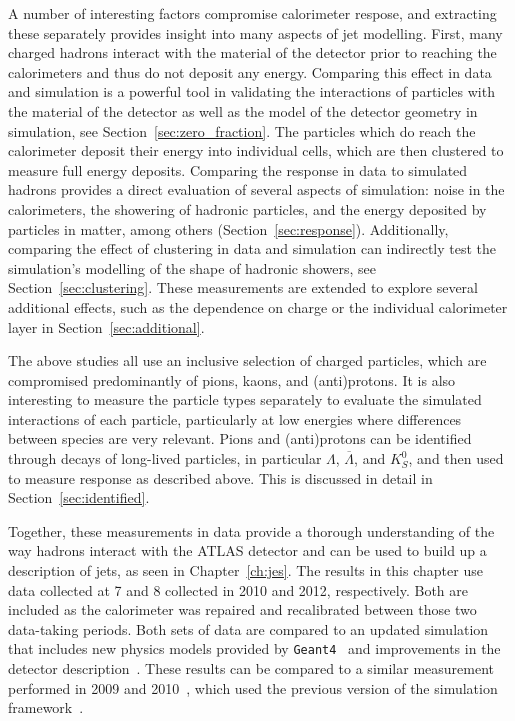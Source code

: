 A number of interesting factors compromise calorimeter respose, and extracting these separately provides insight into many aspects of jet modelling.
First, many charged hadrons interact with the material of the detector prior to reaching the calorimeters and thus do not deposit any energy.
Comparing this effect in data and simulation is a powerful tool in validating the interactions of particles with the material of the detector as well as the model of the detector geometry in simulation, see Section~\ref{sec:zero_fraction}.
The particles which do reach the calorimeter deposit their energy into individual cells, which are then clustered to measure full energy deposits.
Comparing the response in data to simulated hadrons provides a direct evaluation of several aspects of simulation: noise in the calorimeters, the showering of hadronic particles, and the energy deposited by particles in matter, among others (Section~\ref{sec:response}). 
Additionally, comparing the effect of clustering in data and simulation can indirectly test the simulation's modelling of the shape of hadronic showers, see Section~\ref{sec:clustering}.
These measurements are extended to explore several additional effects, such as the dependence on charge or the individual calorimeter layer in Section~\ref{sec:additional}. 

The above studies all use an inclusive selection of charged particles, which are compromised predominantly of pions, kaons, and (anti)protons.
It is also interesting to measure the particle types separately to evaluate the simulated interactions of each particle, particularly at low energies where differences between species are very relevant.
Pions and (anti)protons can be identified through decays of long-lived particles, in particular $\Lambda$, $\overline{\Lambda}$, and $K_{S}^{0}$, and then used to measure response as described above.
This is discussed in detail in Section~\ref{sec:identified}.

Together, these measurements in data provide a thorough understanding of the way hadrons interact with the ATLAS detector and can be used to build up a description of jets, as seen in Chapter~\ref{ch:jes}.
The results in this chapter use data collected at 7 and 8 \TeV collected in 2010 and 2012, respectively.
Both are included as the calorimeter was repaired and recalibrated between those two data-taking periods.
Both sets of data are compared to an updated simulation that includes new physics models provided by \texttt{Geant4}~\cite{GEANT4} and improvements in the detector description~\cite{PERF-2011-08,PERF-2013-05}.
These results can be compared to a similar measurement performed in 2009 and 2010~\cite{PERF-2011-05}, which used the previous version of the simulation framework~\cite{SOFT-2010-01}.

